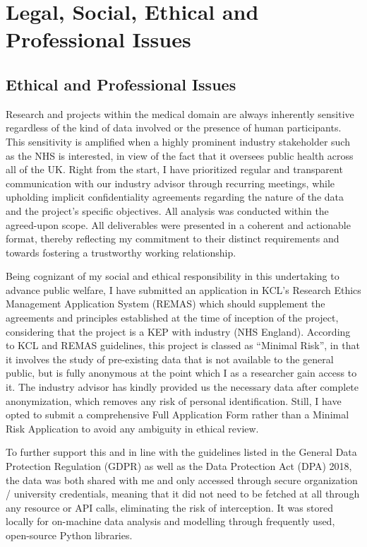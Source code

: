 \section{Legal, Social, Ethical and Professional Issues}

\subsection{Ethical and Professional Issues}
\noindent Research and projects within the medical domain are always inherently sensitive regardless of the kind of data involved or the presence of human participants. This sensitivity is amplified when a highly prominent industry stakeholder such as the NHS is interested, in view of the fact that it oversees public health across all of the UK. Right from the start, I have prioritized regular and transparent communication with our industry advisor through recurring meetings, while upholding implicit confidentiality agreements regarding the nature of the data and the project’s specific objectives. All analysis was conducted within the agreed-upon scope. All deliverables were presented in a coherent and actionable format, thereby reflecting my commitment to their distinct requirements and towards fostering a trustworthy working relationship.

\vspace{5pt}
\noindent Being cognizant of my social and ethical responsibility in this undertaking to advance public welfare, I have submitted an application in KCL’s Research Ethics Management Application System (REMAS) which should supplement the agreements and principles established at the time of inception of the project, considering that the project is a KEP with industry (NHS England). According to KCL and REMAS guidelines, this project is classed as “Minimal Risk”, in that it involves the study of pre-existing data that is not available to the general public, but is fully anonymous at the point which I as a researcher gain access to it. The industry advisor has kindly provided us the necessary data after complete anonymization, which removes any risk of personal identification. Still, I have opted to submit a comprehensive Full Application Form rather than a Minimal Risk Application to avoid any ambiguity in ethical review.

\vspace{5pt}
\noindent To further support this and in line with the guidelines listed in the General Data Protection Regulation (GDPR) as well as the Data Protection Act (DPA) 2018, the data was both shared with me and only accessed through secure organization / university credentials, meaning that it did not need to be fetched at all through any resource or API calls, eliminating the risk of interception. It was stored locally for on-machine data analysis and modelling through frequently used, open-source Python libraries.

